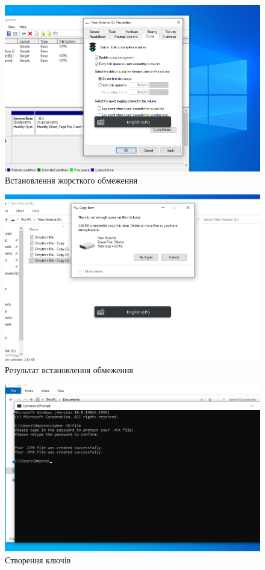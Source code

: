 \documentclass[oneside,14pt]{extarticle}
\begin{document}
\begin{normalsize}
	\begin{figure}[H]
		\centering
		\includegraphics[width=\columnwidth]{12}
		\caption{Встановлення жорсткого обмеження}
	\end{figure}
	
	\begin{figure}[H]
		\centering
		\includegraphics[width=\columnwidth]{13}
		\caption{Результат встановлення обмеження}
	\end{figure}
	
	\begin{figure}[H]
		\centering
		\includegraphics[width=\columnwidth]{14}
		\caption{Створення ключів}
	\end{figure}
	

\end{normalsize}
\end{document}
